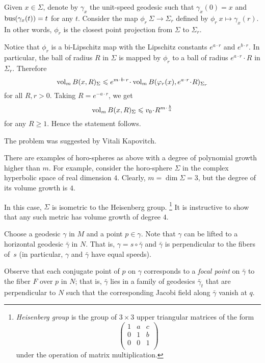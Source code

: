 Given $x\in \Sigma$, denote by $\gamma_x$ 
the unit-speed geodesic
such that $\gamma_x(0)=x$ and $\operatorname{\rm bus}\nolimits(\gamma_x(t))=t$ for any $t$.
Consider the map $\phi_{r}\:\Sigma\to\Sigma_r$ defined by
$\phi_r\:x\mapsto \gamma_x(r)$.
In other words, $\phi_{r}$ is the closest point projection from $\Sigma$ to $\Sigma_r$.

Notice that $\phi_r$ is a bi-Lipschitz map with the Lipschitz constants $e^{a\cdot r}$ and $e^{b\cdot r}$.
In particular, the ball of radius $R$ in $\Sigma$ is mapped by $\phi_r$
to a ball of radius $e^{a\cdot r}\cdot R$ in $\Sigma_r$.
Therefore
\[\vol_m B(x,R)_\Sigma
\le 
e^{m\cdot b\cdot r}\cdot \vol_m B(\phi_r(x),e^{a\cdot r}\cdot R)_{\Sigma_r}\]
for all $R,r>0$.
Taking $R=e^{-a\cdot r}$, we get
\[\vol_m B(x,R)_\Sigma\le v_0\cdot R^{m\cdot \frac ba}\]
for any $R\ge1$. 
Hence the statement follows.
\qeds

The problem was suggested by Vitali Kapovitch.

There are examples of horo-spheres as above with a degree of polynomial growth higher than $m$.
For example, consider the horo-sphere $\Sigma$ in the complex hyperbolic space 
of real dimension $4$.
Clearly, $m=\dim \Sigma=3$, but the degree of its volume growth is $4$.

In this case, $\Sigma$ is isometric to the Heisenberg group.%
\footnote{\emph{Heisenberg group}
is the group of $3\times3$ upper triangular matrices of the form
\[\begin{pmatrix}
 1 & a & c\\
 0 & 1 & b\\
 0 & 0 & 1\\
\end{pmatrix}\]
under the operation of matrix multiplication.} 
It is instructive to show that any such metric has volume  growth of degree $4$.

Choose a geodesic $\gamma$ in $M$ and a point $p\in \gamma$.
Note that $\gamma$ can be lifted to a horizontal geodesic $\bar\gamma$ in $N$.
That is, $\gamma=s\circ\bar\gamma$ and $\bar\gamma$ is perpendicular to the fibers of~$s$ (in particular, $\gamma$ and $\bar\gamma$ have equal speeds).

Observe that each conjugate point of $p$ on $\gamma$ corresponds to a \emph{focal point} on $\bar\gamma$ to the fiber $F$ over $p$ in $N$;
that is, $\bar\gamma$ lies in a family of geodesics $\bar\gamma_t$ that are perpendicular to $N$ 
such that the corresponding Jacobi field along $\bar\gamma$ vanish at $q$.

